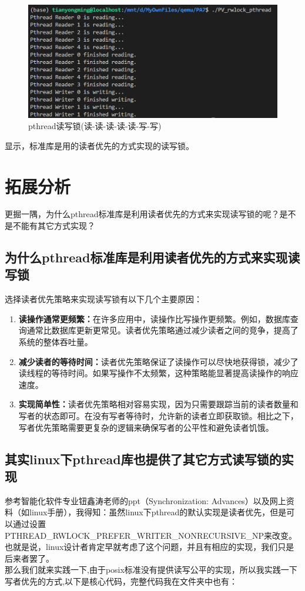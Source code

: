 \documentclass{LabReport}
\begin{document}
\begin{figure}[h!]
	\centering
	\includegraphics[width=0.9\linewidth]{figures/pthread}
	\caption{pthread读写锁(读-读-读-读-读-写-写)}
	\label{fig:pthread}
\end{figure}

	显示，标准库是用的读者优先的方式实现的读写锁。

	\section{拓展分析}
	更掘一隅，为什么pthread标准库是利用读者优先的方式来实现读写锁的呢？是不是不能有其它方式实现？
	
	\subsection{为什么pthread标准库是利用读者优先的方式来实现读写锁}
	选择读者优先策略来实现读写锁有以下几个主要原因：
	\begin{enumerate}
		\item \textbf{读操作通常更频繁：}在许多应用中，读操作比写操作更频繁。例如，数据库查询通常比数据库更新更常见。读者优先策略通过减少读者之间的竞争，提高了系统的整体吞吐量。
		\item \textbf{减少读者的等待时间：}读者优先策略保证了读操作可以尽快地获得锁，减少了读线程的等待时间。如果写操作不太频繁，这种策略能显著提高读操作的响应速度。
		\item \textbf{实现简单性：}读者优先策略相对容易实现，因为只需要跟踪当前的读者数量和写者的状态即可。在没有写者等待时，允许新的读者立即获取锁。相比之下，写者优先策略需要更复杂的逻辑来确保写者的公平性和避免读者饥饿。
	\end{enumerate}

	\subsection{其实linux下pthread库也提供了其它方式读写锁的实现}
	参考智能化软件专业钮鑫涛老师的ppt（Synchronization: Advances）以及网上资料（如linux手册），我得知：虽然linux下pthread的默认实现是读者优先，但是可以通过设置PTHREAD\_RWLOCK\_PREFER\_WRITER\_NONRECURSIVE\_NP来改变。也就是说，linux设计者肯定早就考虑了这个问题，并且有相应的实现，我们只是后来者罢了。\\
	那么我们就来实践一下,由于posix标准没有提供读写公平的实现，所以我实践一下写者优先的方式,以下是核心代码，完整代码我在文件夹中也有：
	
\end{document}
